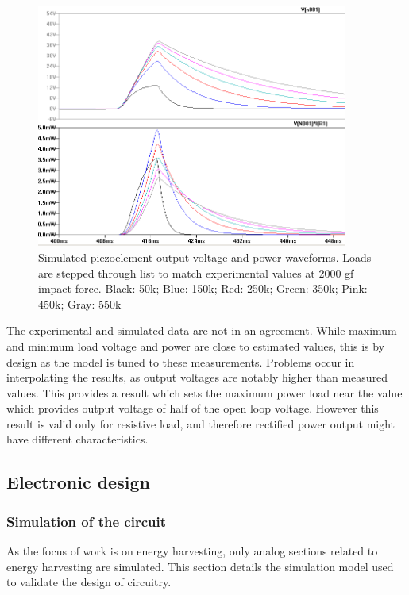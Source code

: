  \begin{figure}[htb]
  \begin{center}
  \includegraphics[height=8cm]{images/own_dwg/ltspice_piezo_simulation}
  \end{center}
  \caption{Simulated piezoelement output voltage and power waveforms. Loads are stepped through list to match experimental values at 2000 gf impact force. Black: 50k; Blue: 150k; Red: 250k; Green: 350k; Pink: 450k; Gray: 550k}
  \label{fiq:piezo_simulation_experimental}
\end{figure}

The experimental and simulated data are not in an agreement. While maximum and minimum load voltage and power are close to estimated values, this is by design as the model is tuned to these measurements. Problems occur in interpolating the results, as output voltages are notably higher than measured values. This provides a result which sets the maximum power load near the value which provides output voltage of half of the open loop voltage. However this result is valid only for resistive load, and therefore rectified power output might have different characteristics. 

\subsection{Electronic design} \label{sect:electronic_design}
\subsubsection{Simulation of the circuit}
As the focus of work is on energy harvesting, only analog sections related to energy harvesting are simulated. This section details the simulation model used to validate the design of circuitry.

